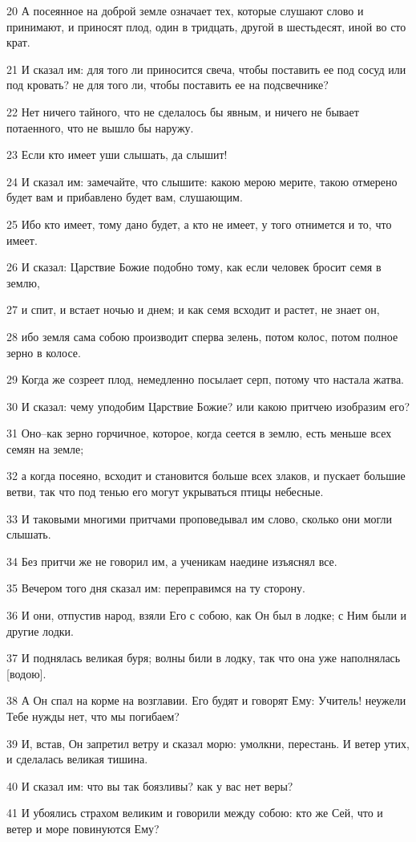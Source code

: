 \par 20 А посеянное на доброй земле означает тех, которые слушают слово и принимают, и приносят плод, один в тридцать, другой в шестьдесят, иной во сто крат.
\par 21 И сказал им: для того ли приносится свеча, чтобы поставить ее под сосуд или под кровать? не для того ли, чтобы поставить ее на подсвечнике?
\par 22 Нет ничего тайного, что не сделалось бы явным, и ничего не бывает потаенного, что не вышло бы наружу.
\par 23 Если кто имеет уши слышать, да слышит!
\par 24 И сказал им: замечайте, что слышите: какою мерою мерите, такою отмерено будет вам и прибавлено будет вам, слушающим.
\par 25 Ибо кто имеет, тому дано будет, а кто не имеет, у того отнимется и то, что имеет.
\par 26 И сказал: Царствие Божие подобно тому, как если человек бросит семя в землю,
\par 27 и спит, и встает ночью и днем; и как семя всходит и растет, не знает он,
\par 28 ибо земля сама собою производит сперва зелень, потом колос, потом полное зерно в колосе.
\par 29 Когда же созреет плод, немедленно посылает серп, потому что настала жатва.
\par 30 И сказал: чему уподобим Царствие Божие? или какою притчею изобразим его?
\par 31 Оно--как зерно горчичное, которое, когда сеется в землю, есть меньше всех семян на земле;
\par 32 а когда посеяно, всходит и становится больше всех злаков, и пускает большие ветви, так что под тенью его могут укрываться птицы небесные.
\par 33 И таковыми многими притчами проповедывал им слово, сколько они могли слышать.
\par 34 Без притчи же не говорил им, а ученикам наедине изъяснял все.
\par 35 Вечером того дня сказал им: переправимся на ту сторону.
\par 36 И они, отпустив народ, взяли Его с собою, как Он был в лодке; с Ним были и другие лодки.
\par 37 И поднялась великая буря; волны били в лодку, так что она уже наполнялась [водою].
\par 38 А Он спал на корме на возглавии. Его будят и говорят Ему: Учитель! неужели Тебе нужды нет, что мы погибаем?
\par 39 И, встав, Он запретил ветру и сказал морю: умолкни, перестань. И ветер утих, и сделалась великая тишина.
\par 40 И сказал им: что вы так боязливы? как у вас нет веры?
\par 41 И убоялись страхом великим и говорили между собою: кто же Сей, что и ветер и море повинуются Ему?

